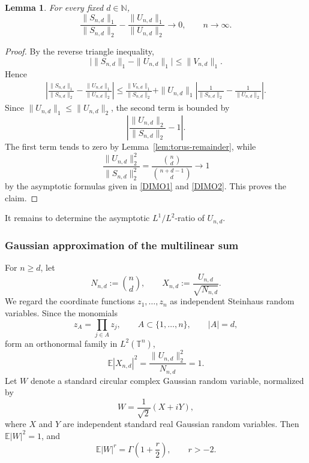 \documentclass[11pt,showkeys]{amsart}
\newtheorem{lemma}[theorem]{Lemma}
\begin{document}
\begin{lemma}
\label{lem:torus-reduction}
For every fixed \(d\in\mathbb N\),
\[
    \frac{\|S_{n,d}\|_1}{\|S_{n,d}\|_2}
    -
    \frac{\|U_{n,d}\|_1}{\|U_{n,d}\|_2}
    \longrightarrow 0,
    \qquad n\to\infty.
\]
\end{lemma}

\begin{proof}
By the reverse triangle inequality,
\[
    \bigl|
        \|S_{n,d}\|_1-\|U_{n,d}\|_1
    \bigr|
    \leq
    \|V_{n,d}\|_1.
\]
Hence
\[
\begin{aligned}
    \left|
        \frac{\|S_{n,d}\|_1}{\|S_{n,d}\|_2}
        -
        \frac{\|U_{n,d}\|_1}{\|U_{n,d}\|_2}
    \right|
    \leq
    \frac{\|V_{n,d}\|_1}{\|S_{n,d}\|_2}
+
    \|U_{n,d}\|_1
    \left|
        \frac{1}{\|S_{n,d}\|_2}
        -
        \frac{1}{\|U_{n,d}\|_2}
    \right|.
\end{aligned}
\]
Since \(\|U_{n,d}\|_1\leq\|U_{n,d}\|_2\), the second term is bounded by
\[
    \left|
        \frac{\|U_{n,d}\|_2}{\|S_{n,d}\|_2}-1
    \right|.
\]
The first term tends to zero by
Lemma~\ref{lem:torus-remainder}, while
\[
    \frac{\|U_{n,d}\|_2^2}{\|S_{n,d}\|_2^2}
    =
    \frac{\binom nd}{\binom{n+d-1}{d}}
    \longrightarrow 1
\]
by the asymptotic formulas given in
\eqref{DIMO1} and \eqref{DIMO2}.
 This proves the claim.
\end{proof}

It remains to determine the asymptotic \(L^1/L^2\)-ratio of
\(U_{n,d}\).

\subsubsection{Gaussian approximation of the multilinear sum}

For \(n\geq d\), let
\[
    N_{n,d}:=\binom nd,
    \qquad
    X_{n,d}:=\frac{U_{n,d}}{\sqrt{N_{n,d}}}.
\]
We regard the coordinate functions \(z_1,\ldots,z_n\) as independent
Steinhaus random variables. Since the monomials
\[
    z_A=\prod_{j\in A}z_j,
    \qquad
    A\subset\{1,\ldots,n\},
    \qquad
    |A|=d,
\]
form an orthonormal family in \(L^2(\mathbb T^n)\),
\[
    \mathbb E|X_{n,d}|^2
    =
    \frac{\|U_{n,d}\|_2^2}{N_{n,d}}
    =
    1.
\]
Let \(W\) denote a standard circular complex Gaussian random variable, 
normalized by
\[
    W=\frac{1}{\sqrt2}(X+iY),
\]
where \(X\) and \(Y\) are independent standard real Gaussian random
variables. Then \(\mathbb E|W|^2=1\), and
\begin{equation}
\label{eq:complex-gaussian-moments}
    \mathbb E|W|^r
    =
    \Gamma\left(1+\frac r2\right),
    \qquad r>-2.
\end{equation}
\end{document}
